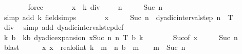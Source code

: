 \begin{isabellebody}
\ \ \ \ \ \ \isamarkupfalse%
\ force\isanewline
\ \ \ \ \isamarkupfalse%
\ \isamarkupfalse%
\ {\isachardoublequoteopen}x\ {\isacharequal}{\kern0pt}\ k\ div\ {}\ {\isacharslash}{\kern0pt}\ {}\ {\isacharcircum}{\kern0pt}\ n\ {\isacharplus}{\kern0pt}\ {}\ {\isacharslash}{\kern0pt}\ {}\ {\isacharcircum}{\kern0pt}\ {\isacharparenleft}{\kern0pt}Suc\ n{\isacharparenright}{\kern0pt}{\isachardoublequoteclose}\isanewline
\ \ \ \ \ \ \isamarkupfalse%
\ {\isacharparenleft}{\kern0pt}simp\ add{\isacharcolon}{\kern0pt}\ k{\isacharparenleft}{\kern0pt}{}{\isacharparenright}{\kern0pt}\ field{\isacharunderscore}{\kern0pt}simps{\isacharparenright}{\kern0pt}\isanewline
\ \ \ \ \isamarkupfalse%
\ \isamarkupfalse%
\ {\isachardoublequoteopen}x\ {\isacharminus}{\kern0pt}\ {}\ {\isacharslash}{\kern0pt}\ {}\ {\isacharcircum}{\kern0pt}\ {\isacharparenleft}{\kern0pt}Suc\ n{\isacharparenright}{\kern0pt}\ {\isasymin}\ dyadic{\isacharunderscore}{\kern0pt}interval{\isacharunderscore}{\kern0pt}step\ n\ {}\ T{\isachardoublequoteclose}\isanewline
\ \ \ \ \ \ \isamarkupfalse%
\ div{}\ \isamarkupfalse%
\ {\isacharparenleft}{\kern0pt}simp\ add{\isacharcolon}{\kern0pt}\ dyadic{\isacharunderscore}{\kern0pt}interval{\isacharunderscore}{\kern0pt}step{\isacharunderscore}{\kern0pt}def{\isacharparenright}{\kern0pt}\isanewline
\ \ \ \ \isamarkupfalse%
\ \isamarkupfalse%
\ k{\isacharprime}{\kern0pt}\ b\ \ kb{\isacharcolon}{\kern0pt}\ {\isachardoublequoteopen}dyadic{\isacharunderscore}{\kern0pt}expansion\ {\isacharparenleft}{\kern0pt}x{\isacharminus}{\kern0pt}{}{\isacharslash}{\kern0pt}{}{\isacharcircum}{\kern0pt}Suc\ n{\isacharparenright}{\kern0pt}\ n\ T\ b\ k{\isacharprime}{\kern0pt}{\isachardoublequoteclose}\isanewline
\ \ \ \ \ \ \isamarkupfalse%
\ Suc{\isacharparenleft}{\kern0pt}{}{\isacharparenright}{\kern0pt}{\isacharbrackleft}{\kern0pt}of\ {\isachardoublequoteopen}x\ {\isacharminus}{\kern0pt}\ {}\ {\isacharslash}{\kern0pt}\ {}\ {\isacharcircum}{\kern0pt}\ {\isacharparenleft}{\kern0pt}Suc\ n{\isacharparenright}{\kern0pt}{\isachardoublequoteclose}{\isacharbrackright}{\kern0pt}\ \isamarkupfalse%
\ blast\isanewline
\ \ \ \ \isamarkupfalse%
\ x{\isacharcolon}{\kern0pt}\ {\isachardoublequoteopen}x\ {\isacharequal}{\kern0pt}\ real{\isacharunderscore}{\kern0pt}of{\isacharunderscore}{\kern0pt}int\ k{\isacharprime}{\kern0pt}\ {\isacharplus}{\kern0pt}\ {\isacharparenleft}{\kern0pt}{\isasymSum}m\ {\isacharequal}{\kern0pt}\ {}{\isachardot}{\kern0pt}{\isachardot}{\kern0pt}n{\isachardot}{\kern0pt}\ b\ {\isacharbang}{\kern0pt}\ {\isacharparenleft}{\kern0pt}m{\isacharminus}{\kern0pt}{}{\isacharparenright}{\kern0pt}\ {\isacharslash}{\kern0pt}\ {}\ {\isacharcircum}{\kern0pt}\ m{\isacharparenright}{\kern0pt}\ {\isacharplus}{\kern0pt}\ {}{\isacharslash}{\kern0pt}{}{\isacharcircum}{\kern0pt}Suc\ n{\isachardoublequoteclose}\isanewline

\end{isabellebody}
